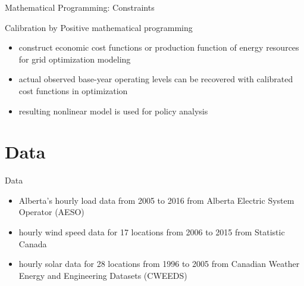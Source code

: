 \documentclass[newPxFont,numfooter,progressbar,sectionpages]{beamer}
\begin{document}

\begin{frame}[c]{Mathematical Programming: Constraints}



\end{frame}



\begin{frame}[c]{Calibration by Positive mathematical programming}

\begin{itemize}
	\item construct economic cost functions or production function of energy resources for grid optimization modeling   
	\item actual observed base-year operating levels can be recovered with calibrated cost functions in optimization
	\item resulting nonlinear model is used for policy analysis
	
\end{itemize}


\end{frame}




%
%
\section{Data}




\begin{frame}[c]{Data}

\begin{itemize}
	\item Alberta’s hourly load data from 2005 to 2016 from Alberta Electric System Operator (AESO)
	\item hourly wind speed data for 17 locations from 2006 to 2015 from Statistic Canada
	\item hourly solar data for 28 locations from 1996 to 2005 from Canadian Weather Energy and Engineering Datasets (CWEEDS)
	
\end{itemize}


\end{frame}
\end{document}
